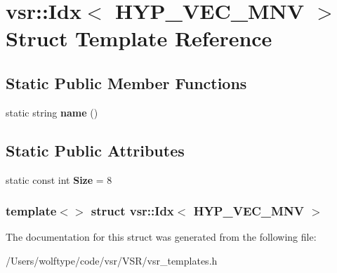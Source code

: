 \hypertarget{structvsr_1_1_idx_3_01_h_y_p___v_e_c___m_n_v_01_4}{\section{vsr\-:\-:Idx$<$ H\-Y\-P\-\_\-\-V\-E\-C\-\_\-\-M\-N\-V $>$ Struct Template Reference}
\label{structvsr_1_1_idx_3_01_h_y_p___v_e_c___m_n_v_01_4}
}
\subsection*{Static Public Member Functions}
\begin{DoxyCompactItemize}
\item 
\hypertarget{structvsr_1_1_idx_3_01_h_y_p___v_e_c___m_n_v_01_4_af0ed610596d68066f6aaca15d7a13f21}{static string {\bfseries name} ()}\label{structvsr_1_1_idx_3_01_h_y_p___v_e_c___m_n_v_01_4_af0ed610596d68066f6aaca15d7a13f21}

\end{DoxyCompactItemize}
\subsection*{Static Public Attributes}
\begin{DoxyCompactItemize}
\item 
\hypertarget{structvsr_1_1_idx_3_01_h_y_p___v_e_c___m_n_v_01_4_a673fb5caa5091179bd0e5fa0610d6f0f}{static const int {\bfseries Size} = 8}\label{structvsr_1_1_idx_3_01_h_y_p___v_e_c___m_n_v_01_4_a673fb5caa5091179bd0e5fa0610d6f0f}

\end{DoxyCompactItemize}
\subsubsection*{template$<$$>$ struct vsr\-::\-Idx$<$ H\-Y\-P\-\_\-\-V\-E\-C\-\_\-\-M\-N\-V $>$}



The documentation for this struct was generated from the following file\-:\begin{DoxyCompactItemize}
\item 
/\-Users/wolftype/code/vsr/\-V\-S\-R/vsr\-\_\-templates.\-h\end{DoxyCompactItemize}
